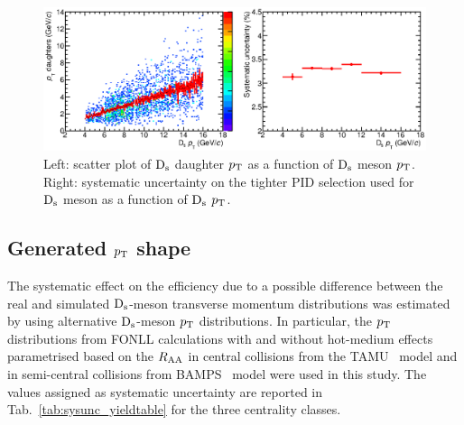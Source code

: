 \begin{figure}[!h]
 \centering
 \includegraphics[angle=0, width=13cm]{./FigCap5/PIDsystDs_MCall.eps}
 \caption{Left: scatter plot of ${\rm D_s}$ daughter $p_{\rm T}$ as a function of ${\rm D_s}$ meson $p_{\rm T}$. Right: systematic uncertainty on the tighter PID selection used for ${\rm D_s}$ meson as a function of ${\rm D_s}$ $p_{\rm T}$.}
 \label{fig:DsPIDsys} 
\end{figure}

\subsection{Generated $p_{\rm T}$ shape}
The systematic effect on the efficiency due to a possible difference between 
the real and simulated ${\rm D_s}$-meson transverse momentum distributions
was estimated by using alternative ${\rm D_s}$-meson $p_{\rm T}$ distributions.
In particular, the $p_{\rm T}$ distributions from FONLL calculations with
and without hot-medium effects parametrised based on the $R_{\rm AA}$ in central collisions from the 
TAMU~\cite{He:2014cla} model and in semi-central collisions from 
BAMPS~\cite{Uphoff:2014hza} model were used in this study.
The values assigned as systematic uncertainty are reported in 
Tab.~\ref{tab:sysunc_yieldtable} for the three centrality classes.


